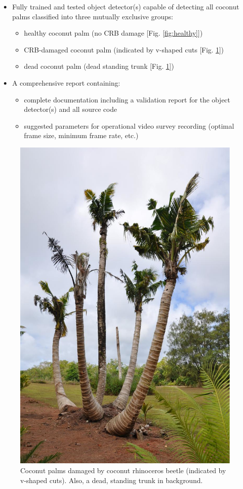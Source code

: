 \documentclass[12pt,letterpaper,english,bibliography=totocnumbered, abstract=on]{scrartcl}
\begin{document}
\begin{itemize}
	
	\item Fully trained and tested object detector(s) capable of detecting all coconut palms classified into three mutually exclusive groups:
	
		\begin{itemize}
			\item healthy coconut palm (no CRB damage [Fig. \ref{fig:healthy}]) 
			\item CRB-damaged coconut palm (indicated by v-shaped cuts [Fig. \ref{fig:dying-coconuts}])
			\item dead coconut palm (dead standing trunk [Fig. \ref{fig:dying-coconuts}])
		\end{itemize}
		
	\item A comprehensive report containing:
	
	\begin{itemize} 
		\item complete documentation including a validation report for the object detector(s) and all source code

		\item suggested parameters for operational video survey recording (optimal frame size, minimum frame rate, etc.)
	\end{itemize}

\end{itemize}

\begin{figure}[]
	\centering
	\includegraphics[width=0.7\linewidth]{images/dying-coconuts.png}
	\caption{Coconut palms damaged by coconut rhinoceros beetle (indicated by v-shaped cuts). Also, a dead, standing trunk in background.}
	\label{fig:dying-coconuts}
\end{figure}
\end{document}
